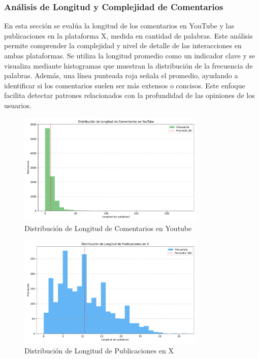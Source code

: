 \documentclass[10pt, a4paper]{article}
\begin{document}
	
	\subsubsection{Análisis de Longitud y Complejidad de Comentarios}
	En esta sección se evalúa la longitud de los comentarios en YouTube y las publicaciones en la plataforma X, medida en cantidad de palabras. Este análisis permite comprender la complejidad y nivel de detalle de las interacciones en ambas plataformas. Se utiliza la longitud promedio como un indicador clave y se visualiza mediante histogramas que muestran la distribución de la frecuencia de palabras. Además, una línea punteada roja señala el promedio, ayudando a identificar si los comentarios suelen ser más extensos o concisos. Este enfoque facilita detectar patrones relacionados con la profundidad de las opiniones de los usuarios.
	
	\vspace{-3mm}
	\begin{figure}[h!]
		\centering
		\includegraphics[width=0.8\textwidth]{longitud_comentarios_youtube.pdf} %
		\vspace{-2mm}
		\caption{Distribución de Longitud de Comentarios en Youtube}
		\label{fig:longYoutube} %
	\end{figure}
	
	\begin{figure}[h!]
		\centering
		\includegraphics[width=0.8\textwidth]{longitud_publicaciones_x.pdf} %
		\vspace{-2mm}
		\caption{Distribución de Longitud de Publicaciones en X}
		\label{fig:longX} %
	\end{figure}
	
\end{document}
